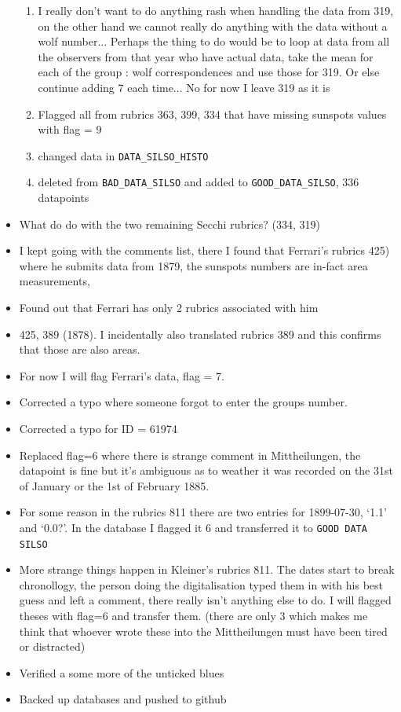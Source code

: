 \documentclass[12pt]{article}
\begin{document}
\begin{itemize}
\begin{enumerate}
        \item I really don't want to do anything rash when handling the data from 319, on the other hand we cannot really do anything with the data without a wolf number... Perhaps the thing to do would be to loop at data from all the observers from that year who have actual data, take the mean for each of the group : wolf correspondences and use those for 319. Or else continue adding 7 each time... No for now I leave 319 as it is
        \item Flagged all from rubrics 363, 399, 334 that have missing sunspots values with flag = 9
        \item changed data in \texttt{DATA\_SILSO\_HISTO}
        \item deleted from \texttt{BAD\_DATA\_SILSO} and added to \texttt{GOOD\_DATA\_SILSO}, 336 datapoints
    \end{enumerate}
    \item What do do with the two remaining Secchi rubrics? (334, 319)
    \item I kept going with the comments list, there I found that Ferrari's rubrics 425) where he submits data from 1879, the sunspots numbers are in-fact area measurements, 
    \item Found out that Ferrari has only 2 rubrics associated with him
    \item 425, 389 (1878). I incidentally also translated rubrics 389 and this confirms that those are also areas. 
    \item For now I will flag Ferrari's data, flag = 7. 
    \item Corrected a typo where someone forgot to enter the groups number.
    \item Corrected a typo for ID = 61974
    \item Replaced flag=6 where there is strange comment in Mittheilungen, the datapoint is fine but it's ambiguous as to weather it was recorded on the 31st of January or the 1st of February 1885.
    \item For some reason in the rubrics 811 there are two entries for 1899-07-30, `1.1' and `0.0?'. In the database I flagged it 6 and transferred it to \texttt{GOOD DATA SILSO}
    \item More strange things happen in Kleiner's rubrics 811. The dates start to break chronollogy, the person doing the digitalisation typed them in with his best guess and left a comment, there really isn't anything else to do. I will flagged theses with flag=6 and transfer them. (there are only 3 which makes me think that whoever wrote these into the Mittheilungen must have been tired or distracted)
    \item Verified a some more of the unticked blues
    \item Backed up databases and pushed to github
\end{itemize}
\end{document}
